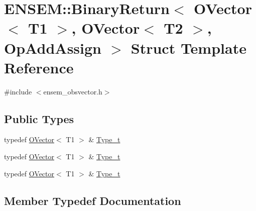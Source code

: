 \hypertarget{structENSEM_1_1BinaryReturn_3_01OVector_3_01T1_01_4_00_01OVector_3_01T2_01_4_00_01OpAddAssign_01_4}{}\section{E\+N\+S\+EM\+:\+:Binary\+Return$<$ O\+Vector$<$ T1 $>$, O\+Vector$<$ T2 $>$, Op\+Add\+Assign $>$ Struct Template Reference}
\label{structENSEM_1_1BinaryReturn_3_01OVector_3_01T1_01_4_00_01OVector_3_01T2_01_4_00_01OpAddAssign_01_4}


{\ttfamily \#include $<$ensem\+\_\+obsvector.\+h$>$}

\subsection*{Public Types}
\begin{DoxyCompactItemize}
\item 
typedef \mbox{\hyperlink{classENSEM_1_1OVector}{O\+Vector}}$<$ T1 $>$ \& \mbox{\hyperlink{structENSEM_1_1BinaryReturn_3_01OVector_3_01T1_01_4_00_01OVector_3_01T2_01_4_00_01OpAddAssign_01_4_a6a0e2c2cf466c9c8da44fef6943d3385}{Type\+\_\+t}}
\item 
typedef \mbox{\hyperlink{classENSEM_1_1OVector}{O\+Vector}}$<$ T1 $>$ \& \mbox{\hyperlink{structENSEM_1_1BinaryReturn_3_01OVector_3_01T1_01_4_00_01OVector_3_01T2_01_4_00_01OpAddAssign_01_4_a6a0e2c2cf466c9c8da44fef6943d3385}{Type\+\_\+t}}
\item 
typedef \mbox{\hyperlink{classENSEM_1_1OVector}{O\+Vector}}$<$ T1 $>$ \& \mbox{\hyperlink{structENSEM_1_1BinaryReturn_3_01OVector_3_01T1_01_4_00_01OVector_3_01T2_01_4_00_01OpAddAssign_01_4_a6a0e2c2cf466c9c8da44fef6943d3385}{Type\+\_\+t}}
\end{DoxyCompactItemize}


\subsection{Member Typedef Documentation}
\mbox{\label{structENSEM_1_1BinaryReturn_3_01OVector_3_01T1_01_4_00_01OVector_3_01T2_01_4_00_01OpAddAssign_01_4_a6a0e2c2cf466c9c8da44fef6943d3385}} 
